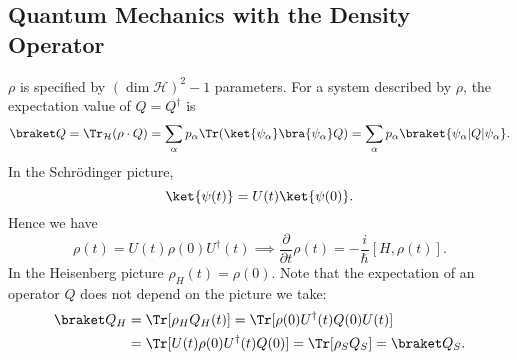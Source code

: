 \documentclass[12pt]{article}
\begin{document}
\subsection{Quantum Mechanics with the Density Operator}
\label{sub:qm_den_op}

$\rho$ is specified by $(\dim \mathcal{H})^2 - 1$ parameters. For a system described by $\rho$, the expectation value of $Q = Q^{\dagger}$ is
\[
	\braket Q = \Tr_{\mathcal{H}} (\rho \cdot Q) = \sum_\alpha p_\alpha \Tr(\ket{\psi_\alpha} \bra{\psi_\alpha} Q) = \sum_\alpha p_\alpha \braket{\psi_\alpha|Q|\psi_\alpha}.
\]
In the Schr\"odinger picture,
\[
	\ket {\psi(t)} = U(t) \ket{\psi(0)}.
\]
Hence we have
\[
	\rho(t) = U(t) \rho(0) U^{\dagger}(t) \implies \frac{\partial}{\partial t}\rho(t) = - \frac{i}{\hbar} [H, \rho(t)].
\]
In the Heisenberg picture $\rho_{H}(t) = \rho(0)$. Note that the expectation of an operator $Q$ does not depend on the picture we take:
\begin{align*}
	\braket Q_H &= \Tr[\rho_H Q_H(t)] = \Tr[\rho(0) U^{\dagger}(t) Q(0) U(t)] \\
		    &= \Tr[U(t) \rho(0) U^{\dagger}(t) Q(0)] = \Tr[\rho_S Q_S] = \braket Q_S.
\end{align*}
\end{document}
